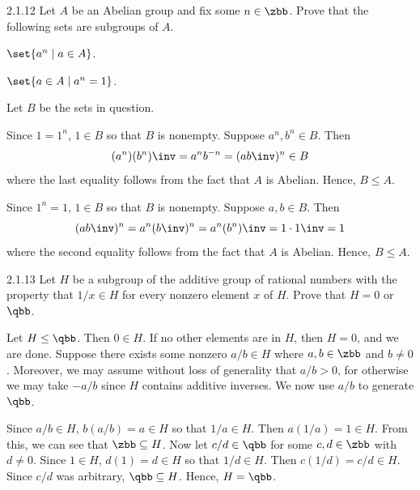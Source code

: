\begin{exercise}{2.1.12}
    Let $A$ be an Abelian group and fix some $n \in \zbb$.
	Prove that the following sets are subgroups of $A$.
    \begin{subexercises}
        \item $\set{ a^n \mid a \in A }$.
        \item $\set{ a \in A \mid a^n = 1 }$.
    \end{subexercises}
\end{exercise}

\begin{sol}
    Let $B$ be the sets in question.
    \begin{subexercises}
        \item Since $1 = 1^n$, $1 \in B$ so that $B$ is nonempty.
        Suppose $a^n, b^n \in B$.
        Then
        \[
        	(a^n)(b^n)\inv = a^n b^{-n} = (ab\inv)^n \in B
        \]
        where the last equality follows from the fact that $A$ is Abelian.
	    Hence, $B \leq A$.
        \item Since $1^n = 1$, $1 \in B$ so that $B$ is nonempty.
        Suppose $a, b \in B$.
        Then
        \[
        	(ab\inv)^n = a^n (b\inv)^n = a^n (b^n)\inv = 1 \cdot 1\inv = 1
        \]
        where the second equality follows from the fact that $A$ is Abelian.
        Hence, $B \leq A$. \qedhere
    \end{subexercises}
\end{sol}

\begin{exercise}{2.1.13}
    Let $H$ be a subgroup of the additive group of rational numbers with the property that $1/x \in H$ for every nonzero element $x$ of $H$.
	Prove that $H = 0$ or $\qbb$.
\end{exercise}

\begin{sol}
    Let $H \leq \qbb$.
	Then $0 \in H$.
	If no other elements are in $H$, then $H = 0$, and we are done.
	Suppose there exists some nonzero $a/b \in H$ where $a, b \in \zbb$ and $b \neq 0$.
	Moreover, we may assume without loss of generality that $a/b > 0$, for otherwise we may take $-a/b$ since $H$ contains additive inverses.
	We now use $a/b$ to generate $\qbb$.

    Since $a/b \in H$, $b(a/b) = a \in H$ so that $1/a \in H$.
	Then $a(1/a) = 1 \in H$.
	From this, we can see that $\zbb \subseteq H$.
	Now let $c/d \in \qbb$ for some $c, d \in \zbb$ with $d \neq 0$.
	Since $1 \in H$, $d(1) = d \in H$ so that $1/d \in H$.
	Then $c(1/d) = c/d \in H$.
	Since $c/d$ was arbitrary, $\qbb \subseteq H$.
	Hence, $H = \qbb$.
\end{sol}

